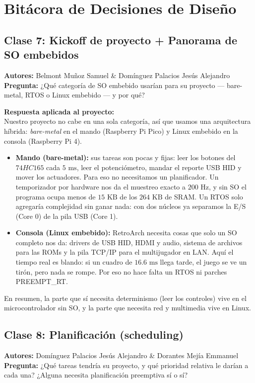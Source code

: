 \documentclass[conference]{IEEEtran}
\begin{document}
\section{Bitácora de Decisiones de Diseño}

\subsection{Clase 7: Kickoff de proyecto + Panorama de SO embebidos}
\textbf{Autores:} Belmont Muñoz Samuel \& Domínguez Palacios Jesús Alejandro \\
\textbf{Pregunta:} ¿Qué categoría de SO embebido usarían para su proyecto — bare-metal, RTOS o Linux embebido — y por qué?

\textbf{Respuesta aplicada al proyecto:} \\
Nuestro proyecto no cabe en una sola categoría, así que usamos una arquitectura híbrida: \textit{bare-metal} en el mando (Raspberry Pi Pico) y Linux embebido en la consola (Raspberry Pi 4).

\begin{itemize}
	\item \textbf{Mando (bare-metal):} sus tareas son pocas y fijas: leer los botones del $74HC165$ cada $5\text{ ms}$, leer el potenciómetro, mandar el reporte USB HID y mover los actuadores. Para eso no necesitamos un planificador. Un temporizador por hardware nos da el muestreo exacto a $200\text{ Hz}$, y sin SO el programa ocupa menos de $15\text{ KB}$ de los $264\text{ KB}$ de SRAM. Un RTOS solo agregaría complejidad sin ganar nada: con dos núcleos ya separamos la E/S (Core 0) de la pila USB (Core 1).
	\item \textbf{Consola (Linux embebido):} RetroArch necesita cosas que solo un SO completo nos da: drivers de USB HID, HDMI y audio, sistema de archivos para las ROMs y la pila TCP/IP para el multijugador en LAN. Aquí el tiempo real es blando: si un cuadro de $16.6\text{ ms}$ llega tarde, el juego se ve un tirón, pero nada se rompe. Por eso no hace falta un RTOS ni parches PREEMPT\_RT.
\end{itemize}

En resumen, la parte que sí necesita determinismo (leer los controles) vive en el microcontrolador sin SO, y la parte que necesita red y multimedia vive en Linux.


\subsection{Clase 8: Planificación (scheduling)}
\textbf{Autores:} Domínguez Palacios Jesús Alejandro \& Dorantes Mejía Emmanuel \\
\textbf{Pregunta:} ¿Qué tareas tendría su proyecto, y qué prioridad relativa le darían a cada una? ¿Alguna necesita planificación preemptiva sí o sí?
\end{document}
